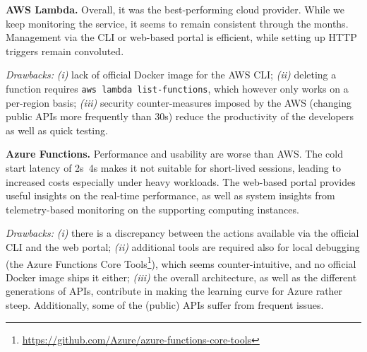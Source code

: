 \textbf{AWS Lambda.} Overall, it was the best-performing cloud provider. 
While we keep monitoring the service, it seems to remain consistent through the months.
Management via the \gls{CLI} or web-based portal is efficient, while setting up HTTP triggers remain convoluted.

\emph{Drawbacks:} 
\emph{(i)} lack of official Docker image for the \gls{AWS} \gls{CLI}; 
\emph{(ii)} deleting a function requires \texttt{aws lambda list-functions}, which however only works on a per-region basis;
\emph{(iii)} security counter-measures imposed by the AWS (\ie changing public APIs more frequently than 30s) reduce the productivity of the developers as well as quick testing.

\textbf{Azure Functions.} Performance and usability are worse than AWS. 
The cold start latency of 2s~4s makes it not suitable for short-lived sessions, leading to increased costs especially under heavy workloads.
The web-based portal provides useful insights on the real-time performance, as well as system insights from telemetry-based monitoring on the supporting computing instances.

\emph{Drawbacks:} 
\emph{(i)} there is a discrepancy between the actions available via the official CLI and the web portal;
\emph{(ii)} additional tools are required also for local debugging (\eg the Azure Functions Core Tools\footnote{\url{https://github.com/Azure/azure-functions-core-tools}}), which seems counter-intuitive, and no official Docker image ships it either;
\emph{(iii)} the overall architecture, as well as the different generations of APIs, contribute in making the learning curve for Azure rather steep. Additionally, some of the (public) APIs suffer from frequent issues.


